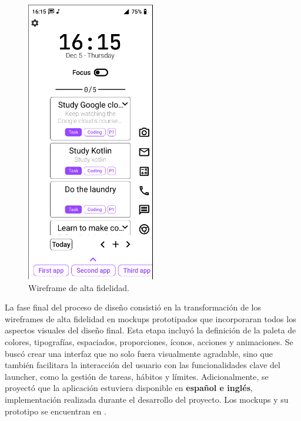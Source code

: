 \begin{figure}[H]
  \caption{Wireframe de alta fidelidad.}
  \label{fig:wireframe_alta_fidelidad}
  \includegraphics[width=0.5\textwidth]{Figuras/wireframe_alta_fidelidad.png}
  \centering
\end{figure}

La fase final del proceso de diseño consistió en la transformación de los wireframes de alta fidelidad en mockups prototipados que incorporaran todos los aspectos visuales del diseño final. Esta etapa incluyó la definición de la paleta de colores, tipografías, espaciados, proporciones, íconos, acciones y animaciones. Se buscó crear una interfaz que no solo fuera visualmente agradable, sino que también facilitara la interacción del usuario con las funcionalidades clave del launcher, como la gestión de tareas, hábitos y límites. Adicionalmente, se proyectó que la aplicación estuviera disponible en \textbf{español e inglés}, implementación realizada durante el desarrollo del proyecto. Los mockups y su prototipo se encuentran en \cite{Mockups}.

